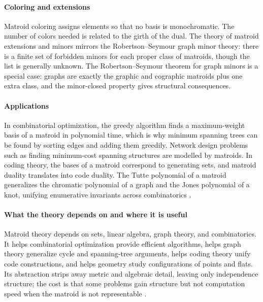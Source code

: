 \paragraph{Coloring and extensions}
Matroid coloring assigns elements so that no basis is monochromatic. The number of colors needed is related to the girth of the dual. The theory of matroid extensions and minors mirrors the Robertson--Seymour graph minor theory: there is a finite set of forbidden minors for each proper class of matroids, though the list is generally unknown. The Robertson--Seymour theorem for graph minors is a special case: graphs are exactly the graphic and cographic matroids plus one extra class, and the minor-closed property gives structural consequences.

\paragraph{Applications}
In combinatorial optimization, the greedy algorithm finds a maximum-weight basis of a matroid in polynomial time, which is why minimum spanning trees can be found by sorting edges and adding them greedily. Network design problems such as finding minimum-cost spanning structures are modelled by matroids. In coding theory, the bases of a matroid correspond to generating sets, and matroid duality translates into code duality. The Tutte polynomial of a matroid generalizes the chromatic polynomial of a graph and the Jones polynomial of a knot, unifying enumerative invariants across combinatorics \cite{matroid_theory_ref3}.

\paragraph{What the theory depends on and where it is useful}
Matroid theory depends on sets, linear algebra, graph theory, and combinatorics. It helps combinatorial optimization provide efficient algorithms, helps graph theory generalize cycle and spanning-tree arguments, helps coding theory unify code constructions, and helps geometry study configurations of points and flats. Its abstraction strips away metric and algebraic detail, leaving only independence structure; the cost is that some problems gain structure but not computation speed when the matroid is not representable \cite{matroid_theory_ref1}.

